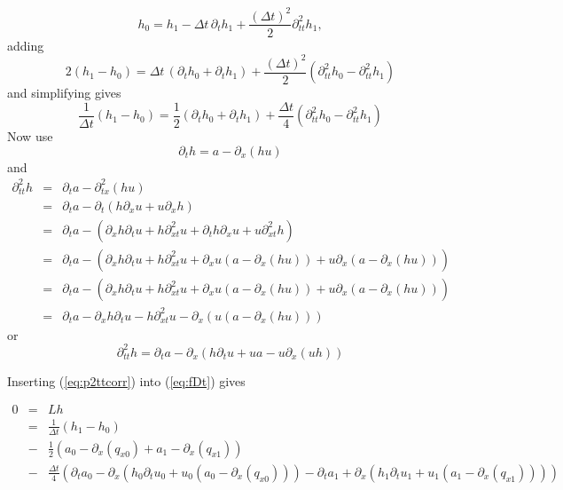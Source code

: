 \documentclass[10pt,a4paper]{book}
\newcommand{\p}{\partial}
\begin{document}
\[
h_0=h_1- \Delta t \, \p_t h_1 + \frac{(\Delta t)^2}{2} \p^2_{tt} h_1,
\] 
adding
\[
2(h_1-h_0)= \Delta t \, (\p_t h_0 + \p_t h_1) + \frac{(\Delta t)^2}{2} (\p^2_{tt} h_0 -\p^2_{tt} h_1)
\]
and simplifying gives
\begin{equation}
\frac{1}{\Delta t}(h_1-h_0)= \frac{1}{2} (\p_t h_0+ \p_t h_1) + \frac{\Delta t}{4} (\p^2_{tt} h_0 - \p^2_{tt} h_1)
\label{eq:fDt2}
\end{equation}
Now use
\[
\p_t h= a- \p_x(h u)
\]
and
\begin{eqnarray}
\p^2_{tt} h &=& \p_t a -\p^2_{tx} ( h u) \nonumber \\
           &=& \p_t a -\p_{t} ( h \p_x u+ u \p_x h) \nonumber \\
           &=& \p_t a -( \p_x h \p_t u + h \p^2_{xt} u + \p_t h \p_x u+ u \p^2_{xt} h) \nonumber \\
           &=& \p_t a - ( \p_x h \p_t u + h \p^2_{xt} u + \p_x u (a-\p_x (h u)) + u \p_{x} (a-\p_x (h u))) \nonumber \\
           &=& \p_t a - ( \p_x h \p_t u + h \p^2_{xt} u + \p_x u (a-\p_x (h u)) + u \p_{x} (a-\p_x (h u))) \nonumber \\
           &=& \p_t a -  \p_x h \p_t u - h \p^2_{xt} u - \p_x (u (a-\p_x (h u))) \nonumber 
\end{eqnarray}
or
\begin{equation}
\p^2_{tt} h = \p_t a - \p_x ( h \p_t u + u a - u \p_x(u h))
\label{eq:p2ttcorr}
\end{equation}


Inserting (\ref{eq:p2ttcorr}) into (\ref{eq:fDt}) gives

\begin{eqnarray*}
0 &=& L h \\
&=& \frac{1}{\Delta t}(h_1-h_0) \\
&-& \frac{1}{2} (a_0 -\p_x( q_{x0}) + a_1 -\p_x(q_{x1} )) \\
&-& \frac{\Delta t}{4} (  \p_t a_0 -\p_x ( h_0 \p_t u_0 + u_0 (a_0-\p_x (q_{x0}))) -  \p_t a_1 +\p_x ( h_1 \p_t u_1+ u_1 (a_1-\p_x (q_{x1}))))
\end{eqnarray*}
\end{document}
